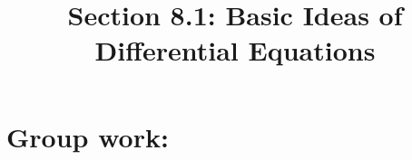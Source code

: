 \documentclass[noinstructornotes]{ximera}
\title{Section 8.1: Basic Ideas of Differential Equations}
\begin{document}
\begin{abstract}		\end{abstract}
\maketitle

\section{Group work:}
\end{document}

